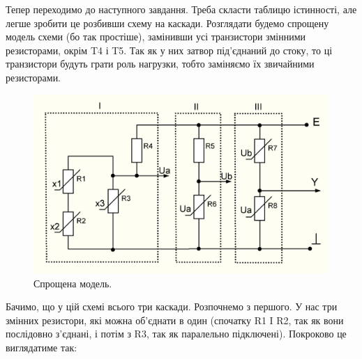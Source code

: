 \documentclass[a4paper,14pt]{extreport}
\begin{document}
	Тепер переходимо до наступного завдання. Треба скласти таблицю істинності, але легше зробити це розбивши схему на каскади. Розглядати будемо спрощену модель схеми (бо так простіше), замінивши усі транзистори змінними резисторами, окрім T4 і T5. Так як у них затвор під’єднаний до стоку, то ці транзистори будуть грати роль нагрузки, тобто заміняємо їх звичайними резисторами.
	\newpage


	\begin{figure}[h!]
	\begin{center}\includegraphics[width=1\linewidth]{3-a.png}\end{center}
	\caption{Спрощена модель.}
	\label{ris3}
	\end{figure}


	Бачимо, що у цій схемі всього три каскади. Розпочнемо з першого. У нас три змінних резистори, які можна об’єднати в один (спочатку R1 I R2, так як вони послідовно з'єднані, і потім з R3, так як паралельно підключені). Покроково це виглядатиме так:


	\newpage

	\begin{figure}[h!]
	\label{ris4}
	\end{figure}
\end{document}
